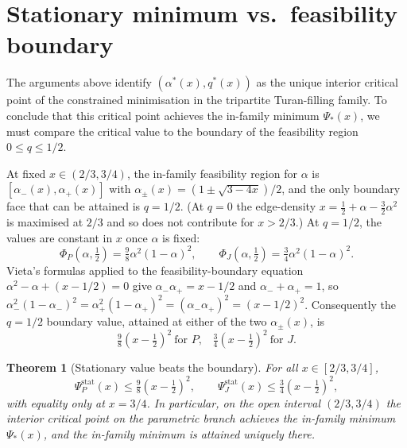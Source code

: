 \documentclass[11pt]{amsart}
\newtheorem{theorem}{Theorem}[section]
\theoremstyle{definition}
\begin{document}
\section{Stationary minimum vs.\ feasibility boundary}
\label{sec:stat-vs-bdry}

The arguments above identify $(\alpha^*(x),q^*(x))$ as the unique interior
critical point of the constrained minimisation in the tripartite Turan-filling
family.  To conclude that this critical point achieves the in-family minimum
$\Psi_*(x)$, we must compare the critical value to the
boundary of the feasibility region $0\le q\le 1/2$.

At fixed $x\in(2/3,3/4)$, the in-family feasibility region for $\alpha$ is
$[\alpha_-(x),\alpha_+(x)]$ with $\alpha_\pm(x) = (1\pm\sqrt{3-4x})/2$, and
the only boundary face that can be attained is $q=1/2$.  (At $q=0$ the
edge-density $x = \tfrac12+\alpha-\tfrac32\alpha^2$ is maximised at $2/3$
and so does not contribute for $x>2/3$.)  At $q=1/2$, the values are
constant in $x$ once $\alpha$ is fixed:
\[
   \Phi_P(\alpha,\tfrac12)
   = \tfrac98 \alpha^2(1-\alpha)^2,
   \qquad
   \Phi_J(\alpha,\tfrac12) = \tfrac34 \alpha^2(1-\alpha)^2.
\]
Vieta's formulas applied to the feasibility-boundary equation
$\alpha^2-\alpha+(x-1/2)=0$ give $\alpha_-\alpha_+ = x-1/2$ and
$\alpha_-+\alpha_+=1$, so
$\alpha_-^2(1-\alpha_-)^2 = \alpha_+^2(1-\alpha_+)^2 = (\alpha_-\alpha_+)^2 = (x-1/2)^2$.
Consequently the $q=1/2$ boundary value, attained at either of the two
$\alpha_\pm(x)$, is
\[
   \tfrac98 (x-\tfrac12)^2\ \text{for $P$,}\quad
   \tfrac34 (x-\tfrac12)^2\ \text{for $J$.}
\]

\begin{theorem}[Stationary value beats the boundary]
\label{thm:stat-vs-bdry}
For all $x\in[2/3,3/4]$,
\[
   \Psi_P^{\text{stat}}(x) \le \tfrac98 (x-\tfrac12)^2,
   \qquad
   \Psi_J^{\text{stat}}(x) \le \tfrac34 (x-\tfrac12)^2,
\]
with equality only at $x=3/4$.  In particular, on the open interval
$(2/3,3/4)$ the interior critical point on the parametric branch achieves
the in-family minimum $\Psi_*(x)$, and the in-family minimum is attained
uniquely there.
\end{theorem}
\end{document}
